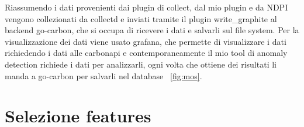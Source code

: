 Riassumendo i dati provenienti dai plugin di collect, dal mio plugin e da NDPI vengono collezionati da collectd e inviati tramite il plugin write\_graphite al backend go-carbon, che si occupa di ricevere i dati e salvarli sul file system. Per la visualizzazione dei dati viene usato grafana, che permette di visualizzare i dati richiedendo i dati alle carbonapi e contemporaneamente il mio tool di anomaly detection richiede i dati per analizzarli, ogni volta che ottiene dei risultati li manda a go-carbon per salvarli nel database ~\ref{fig:mos}.


\section{Selezione features}

